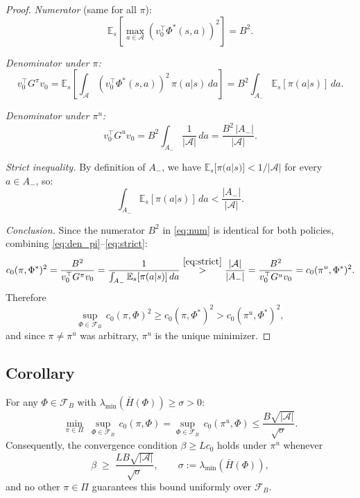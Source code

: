 \documentclass[12pt]{article}
\begin{document}
\begin{proof}
\textit{Numerator} (same for all $\pi$):
\begin{equation}
\mathbb{E}_s\!\left[\max_{a \in \mathcal{A}}(v_0^\top\Phi^*(s,a))^2\right]
= B^2. \label{eq:num}
\end{equation}

\textit{Denominator under $\pi$:}
\begin{equation}
v_0^\top G^\pi v_0
= \mathbb{E}_s\!\left[\int_\mathcal{A}(v_0^\top\Phi^*(s,a))^2\,\pi(a|s)\,da\right]
= B^2\int_{A_-}\mathbb{E}_s[\pi(a|s)]\,da. \label{eq:den_pi}
\end{equation}

\textit{Denominator under $\pi^u$:}
\begin{equation}
v_0^\top G^u v_0
= B^2\int_{A_-}\frac{1}{|\mathcal{A}|}\,da
= \frac{B^2\,|A_-|}{|\mathcal{A}|}. \label{eq:den_u}
\end{equation}

\textit{Strict inequality.}
By definition of $A_-$, we have
$\mathbb{E}_s[\pi(a|s)] < 1/|\mathcal{A}|$ for every $a \in A_-$, so:
\begin{equation}
\int_{A_-}\mathbb{E}_s[\pi(a|s)]\,da
< \frac{|A_-|}{|\mathcal{A}|}. \label{eq:strict}
\end{equation}

\textit{Conclusion.}
Since the numerator $B^2$ in \eqref{eq:num} is identical for both policies,
combining \eqref{eq:den_pi}--\eqref{eq:strict}:
\begin{equation*}
c_0(\pi,\Phi^*)^2
= \frac{B^2}{v_0^\top G^\pi v_0}
= \frac{1}{\int_{A_-}\mathbb{E}_s[\pi(a|s)]\,da}
\overset{\eqref{eq:strict}}{>}
\frac{|\mathcal{A}|}{|A_-|}
= \frac{B^2}{v_0^\top G^u v_0}
= c_0(\pi^u,\Phi^*)^2.
\end{equation*}
Therefore
\begin{equation*}
\sup_{\Phi\in\mathcal{F}_B}\, c_0(\pi,\Phi)^2
\geq c_0(\pi,\Phi^*)^2
> c_0(\pi^u,\Phi^*)^2,
\end{equation*}
and since $\pi \neq \pi^u$ was arbitrary, $\pi^u$ is the unique minimizer.
\end{proof}

\subsection*{Corollary}

For any $\Phi \in \mathcal{F}_B$ with $\lambda_{\min}(\bar{H}(\Phi)) \geq \sigma > 0$:
\begin{equation*}
\min_{\pi\in\Pi}\;\sup_{\Phi\in\mathcal{F}_B}\, c_0(\pi,\Phi)
= \sup_{\Phi\in\mathcal{F}_B}\, c_0(\pi^u,\Phi)
\leq \frac{B\sqrt{|\mathcal{A}|}}{\sqrt{\sigma}}.
\end{equation*}
Consequently, the convergence condition $\beta \geq Lc_0$ holds under $\pi^u$
whenever
\begin{equation*}
\beta \;\geq\; \frac{LB\sqrt{|\mathcal{A}|}}{\sqrt{\sigma}},
\qquad \sigma := \lambda_{\min}(\bar{H}(\Phi)),
\end{equation*}
and no other $\pi \in \Pi$ guarantees this bound uniformly over $\mathcal{F}_B$.




 
\end{document}

